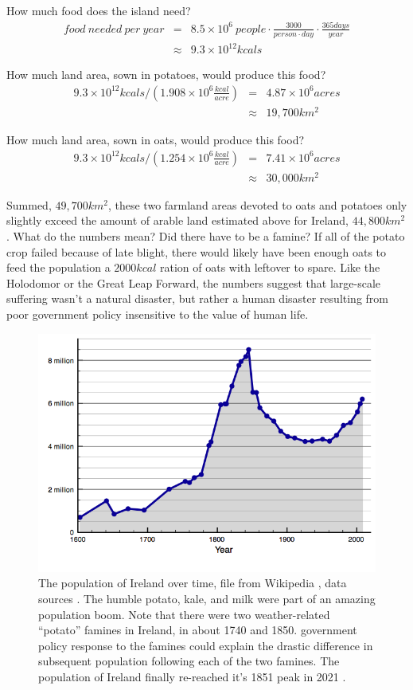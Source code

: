 \documentclass[12pt]{iopart}
\newcommand{\bea}{\begin{eqnarray}}
\newcommand{\eea}{\end{eqnarray}}
\begin{document}
How much food does the island need?
\bea
food~needed~per~year &=& 8.5\times10^6~people
	\cdot \frac{3000}{person\cdot day }
	\cdot \frac{365days}{year} \nonumber \\
&\approx& 9.3\times 10^{12} kcals \nonumber
\eea       

How much land area, sown in potatoes, would produce this food?
\bea
9.3\times10^{12}kcals /\left(1.908\times 10^6\frac{kcal}{acre}\right) &=& 4.87\times10^6 acres \nonumber\\
 &\approx& 19,700 km^2 \nonumber
\eea

How much land area, sown in oats, would produce this food?
\bea
9.3\times10^{12}kcals /\left(1.254\times10^6\frac{kcal}{acre}\right) &=& 7.41 \times10^6 acres \nonumber \\
 &\approx& 30,000 km^2 \nonumber
\eea

Summed, $49,700km^2$, these two farmland areas devoted to oats and potatoes only slightly exceed the amount of arable land estimated above for Ireland, $44,800km^2$ \cite{arable_percentage}.  What do the numbers mean?  Did there have to be a famine?  If all of the potato crop failed because of late blight, there would likely have been enough oats to feed the population a $2000kcal$ ration of oats with leftover to spare.  
Like the Holodomor or the Great Leap Forward, the numbers suggest that large-scale suffering wasn't  a natural disaster, but rather a human disaster resulting from poor government policy insensitive to the value of human life.    



\begin{figure}[ht!]
\centering
\includegraphics[width=\columnwidth]{Population_of_Ireland_since_1600.png}
\caption{
The population of Ireland over time, file from Wikipedia \cite{pop_image}, data sources \cite{pop_sources}. The humble potato, kale, and milk were part of an amazing population boom.  Note that there were two weather-related ``potato'' famines in Ireland, in about 1740 and 1850.  government policy response to the famines could explain the drastic difference in subsequent population following each of the two famines.  The population of Ireland finally re-reached it's 1851 peak in 2021 \cite{Ireland_5M}.  
}
\label{ireland_population}
\end{figure}
\end{document}
